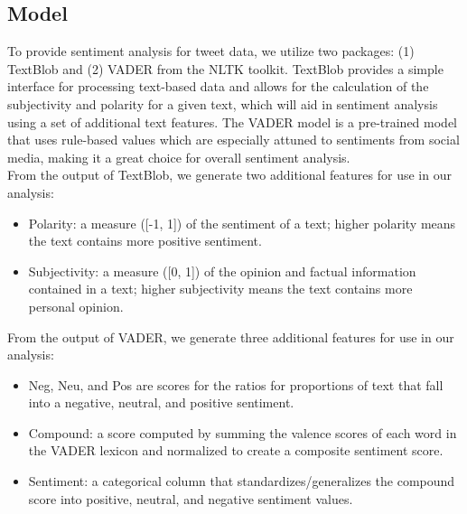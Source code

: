 \documentclass[12pt]{article}
\begin{document}
        \subsection{Model}

        To provide sentiment analysis for tweet data, we utilize two packages: (1) TextBlob and (2) VADER from the NLTK toolkit. TextBlob provides a simple interface 
        for processing text-based data and allows for the calculation of the subjectivity and polarity for a given text, which will aid in sentiment analysis using a 
        set of additional text features. The VADER model is a pre-trained model that uses rule-based values which are especially attuned to sentiments from social 
        media, making it a great choice for overall sentiment analysis. \\

        \noindent From the output of TextBlob, we generate two additional features for use in our analysis:
        \begin{itemize}
            \item Polarity: a measure ([-1, 1]) of the sentiment of a text; higher polarity means the text contains more positive sentiment.
            \item Subjectivity: a measure ([0, 1]) of the opinion and factual information contained in a text; higher subjectivity means the text contains more personal opinion.
        \end{itemize}
        
        \noindent From the output of VADER, we generate three additional features for use in our analysis:
        \begin{itemize}
            \item Neg, Neu, and Pos are scores for the ratios for proportions of text that fall into a negative, neutral, and positive sentiment.
            \item Compound: a score computed by summing the valence scores of each word in the VADER lexicon and normalized to create a composite sentiment score.
            \item Sentiment: a categorical column that standardizes/generalizes the compound score into positive, neutral, and negative sentiment values.
        \end{itemize}
        
\end{document}
